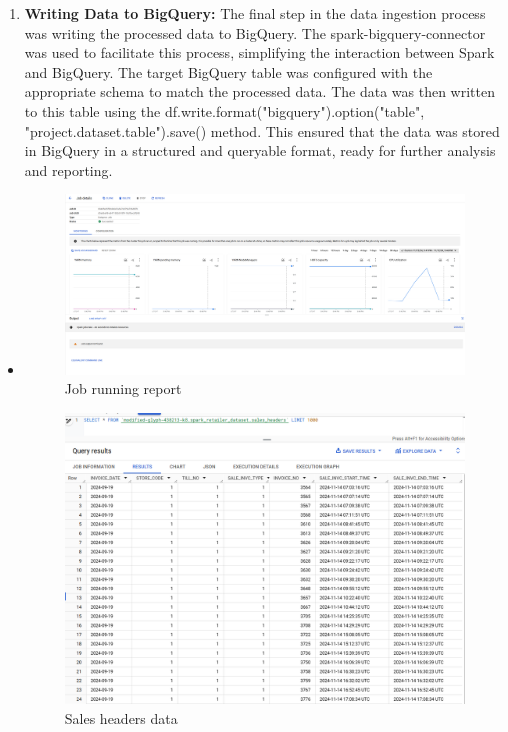 \begin{enumerate}
    \item \textbf{Writing Data to BigQuery:} The final step in the data ingestion process was
        writing the processed data to BigQuery. The spark-bigquery-connector was used to facilitate
        this process, simplifying the interaction between Spark and BigQuery. The target BigQuery
        table was configured with the appropriate schema to match the processed data. The data was
        then written to this table using the df.write.format("bigquery").option("table",
        "project.dataset.table").save() method. This ensured that the data was stored in BigQuery in
        a structured and queryable format, ready for further analysis and reporting.
\end{enumerate}
    \begin{itemize}
        \item
            \begin{figure}
                \centering
                \includegraphics[width=.8\linewidth]{images/data-proc-job.png}
                \caption{Job running report}
            \end{figure}
            \begin{figure}
                \centering
                \includegraphics[width=.8\linewidth]{images/data-from-spark.png}
                \caption{Sales headers data}
            \end{figure}
    \end{itemize}

